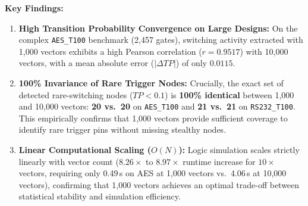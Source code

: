 \documentclass[11pt,a4paper]{article}
\begin{document}
\begin{table}[htbp]
\centering
\caption{Empirical Stimulus Sensitivity: 1,000 vs.\ 10,000 Vectors across Small and Large Benchmarks}
\label{tab:stimulus_sensitivity}
\vspace{4pt}
\end{table}

\textbf{Key Findings:}
\begin{enumerate}[leftmargin=*]
    \item \textbf{High Transition Probability Convergence on Large Designs:} On the complex \texttt{AES\_T100} benchmark (2,457 gates), switching activity extracted with 1,000 vectors exhibits a high Pearson correlation ($r = 0.9517$) with 10,000 vectors, with a mean absolute error ($|\Delta TP|$) of only $0.0115$.
    \item \textbf{100\% Invariance of Rare Trigger Nodes:} Crucially, the exact set of detected rare-switching nodes ($TP < 0.1$) is \textbf{100\% identical} between 1,000 and 10,000 vectors: \textbf{20 vs.\ 20} on \texttt{AES\_T100} and \textbf{21 vs.\ 21} on \texttt{RS232\_T100}. This empirically confirms that 1,000 vectors provide sufficient coverage to identify rare trigger pins without missing stealthy nodes.
    \item \textbf{Linear Computational Scaling ($O(N)$):} Logic simulation scales strictly linearly with vector count ($8.26\times$ to $8.97\times$ runtime increase for $10\times$ vectors, requiring only 0.49\,s on AES at 1,000 vectors vs.\ 4.06\,s at 10,000 vectors), confirming that 1,000 vectors achieves an optimal trade-off between statistical stability and simulation efficiency.
\end{enumerate}
\end{document}
